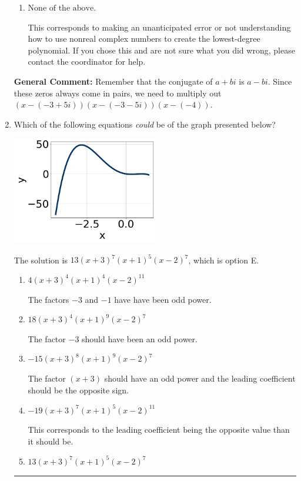 \documentclass{extbook}[14pt]
\newcommand{\litem}[1]{\item #1

\rule{\textwidth}{0.4pt}}
\begin{document}
\begin{enumerate}
{\begin{enumerate}[label=\Alph*.]
$x^{3} + x^{2} +7 x + 12$, which corresponds to multiplying out $(x + 3)(x + 4)$.
\item \( \text{None of the above.} \)

This corresponds to making an unanticipated error or not understanding how to use nonreal complex numbers to create the lowest-degree polynomial. If you chose this and are not sure what you did wrong, please contact the coordinator for help.
\end{enumerate}

\textbf{General Comment:} Remember that the conjugate of $a+bi$ is $a-bi$. Since these zeros always come in pairs, we need to multiply out $(x-(-3 + 5 i))(x-(-3 - 5 i))(x-(-4))$.
}
\litem{
Which of the following equations \textit{could} be of the graph presented below?

\begin{center}
    \includegraphics[width=0.5\textwidth]{../Figures/polyGraphToFunctionCopyB.png}
\end{center}


The solution is \( 13(x + 3)^{7} (x + 1)^{5} (x - 2)^{7} \), which is option E.\begin{enumerate}[label=\Alph*.]
\item \( 4(x + 3)^{4} (x + 1)^{4} (x - 2)^{11} \)

The factors $-3$ and $-1$ have have been odd power.
\item \( 18(x + 3)^{4} (x + 1)^{9} (x - 2)^{7} \)

The factor $-3$ should have been an odd power.
\item \( -15(x + 3)^{8} (x + 1)^{9} (x - 2)^{7} \)

The factor $(x + 3)$ should have an odd power and the leading coefficient should be the opposite sign.
\item \( -19(x + 3)^{7} (x + 1)^{5} (x - 2)^{11} \)

This corresponds to the leading coefficient being the opposite value than it should be.
\item \( 13(x + 3)^{7} (x + 1)^{5} (x - 2)^{7} \)


\end{enumerate}}
\end{enumerate}
\end{document}
